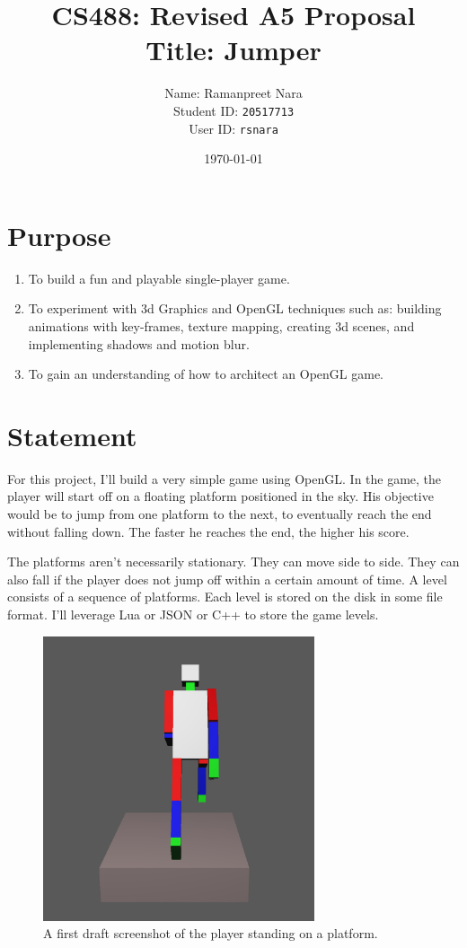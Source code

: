\documentclass[11pt]{article}
\title{CS488: Revised A5 Proposal \\ \small{Title:  Jumper}}
\date{\today}
\author{Name: Ramanpreet Nara \\ Student ID: \texttt{20517713} \\ User ID: \texttt{rsnara}}
\begin{document}
\maketitle
\newpage
\section{Purpose}
\begin{enumerate}
\item To build a fun and playable single-player game.
\item To experiment with 3d Graphics and OpenGL techniques such as: building animations with key-frames, texture mapping, creating 3d scenes, and implementing shadows and motion blur.
\item To gain an understanding of how to architect an OpenGL game.
\end{enumerate}
\section{Statement}
For this project, I'll build a very simple game using OpenGL. In the game, the player will start off on a floating platform positioned in the sky. His objective would be to jump from one platform to the next, to eventually reach the end without falling down. The faster he reaches the end, the higher his score.

The platforms aren't necessarily stationary. They can move side to side. They can also fall if the player does not jump off within a certain amount of time. A level consists of a sequence of platforms. Each level is stored on the disk in some file format. I'll leverage Lua or JSON or C++ to store the game levels. 

\begin{figure}[H]
\includegraphics[width=8cm]{screenshot}
\centering
\caption{A first draft screenshot of the player standing on a platform.}
\end{figure}
\end{document}
